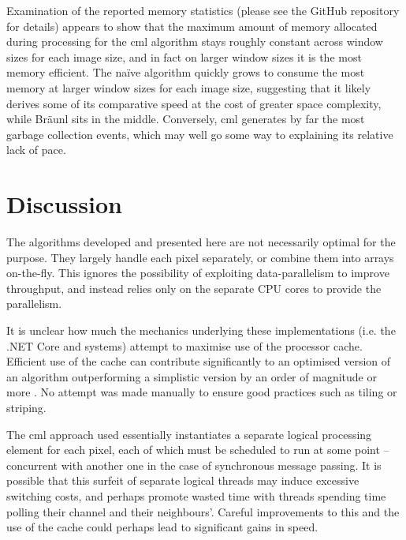 Examination of the reported memory statistics (please see the GitHub repository for details) appears to show that the maximum amount of memory allocated during processing for the \gls{cml} algorithm stays roughly constant across window sizes for each image size, and in fact on larger window sizes it is the most memory efficient.  The naïve algorithm quickly grows to consume the most memory at larger window sizes for each image size, suggesting that it likely derives some of its comparative speed at the cost of greater space complexity, while Bräunl sits in the middle.  Conversely, \gls{cml} generates by far the most garbage collection events, which may well go some way to explaining its relative lack of pace.

\section{Discussion}

The algorithms developed and presented here are not necessarily optimal for the purpose.  They largely handle each pixel separately, or combine them into arrays on-the-fly.  This ignores the possibility of exploiting data-parallelism to improve throughput, and instead relies only on the separate CPU cores to provide the parallelism.

It is unclear how much the mechanics underlying these implementations (i.e. the .NET Core and \hopac{} systems) attempt to maximise use of the processor cache.  Efficient use of the cache can contribute significantly to an optimised version of an algorithm outperforming a simplistic version by an order of magnitude or more \cite{Ragan-Kelley2017}.  No attempt was made manually to ensure good practices such as tiling or striping.  %

The \gls{cml} approach used essentially instantiates a separate logical processing element for each pixel, each of which must be scheduled to run at some point -- concurrent with another one in the case of synchronous message passing.  It is possible that this surfeit of separate logical threads may induce excessive switching costs, and perhaps promote wasted time with threads spending time polling their channel and their neighbours'.  Careful improvements to this and the use of the cache could perhaps lead to significant gains in speed.

